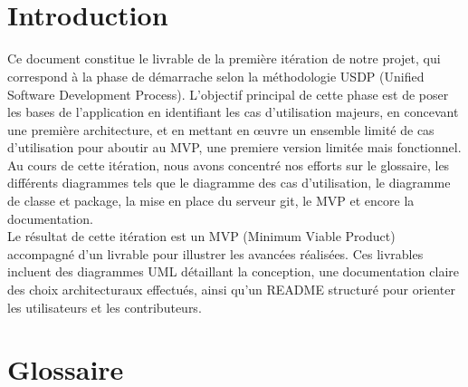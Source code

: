 \documentclass[a4paper]{article}
\begin{document}
\newcommand{\HRule}{\rule{\linewidth}{0.5mm}}



~
\thispagestyle{empty}

\tableofcontents
\thispagestyle{empty}
\setcounter{page}{0}

\renewcommand{\arraystretch}{1.5}


~
\thispagestyle{empty}
\setcounter{page}{0}
\newpage

\section*{Introduction} \label{ch1}

Ce document constitue le livrable de la première itération de notre projet, qui correspond à la phase de démarrache selon la méthodologie USDP (Unified Software Development Process). L'objectif principal de cette phase est de poser les bases de l'application en identifiant les cas d'utilisation majeurs, en concevant une première architecture, et en mettant en œuvre un ensemble limité de cas d'utilisation pour aboutir au MVP, une premiere version limitée mais fonctionnel.\\
\newline
\indent Au cours de cette itération, nous avons concentré nos efforts sur le glossaire, les différents diagrammes tels que le diagramme des cas d'utilisation, le diagramme de classe et package, la mise en place du serveur git, le MVP et encore la documentation. \\
\newline
Le résultat de cette itération est un MVP (Minimum Viable Product) accompagné d'un livrable pour illustrer les avancées réalisées. Ces livrables incluent des diagrammes UML détaillant la conception, une documentation claire des choix architecturaux effectués, ainsi qu’un README structuré pour orienter les utilisateurs et les contributeurs.

\section{Glossaire}
\end{document}
